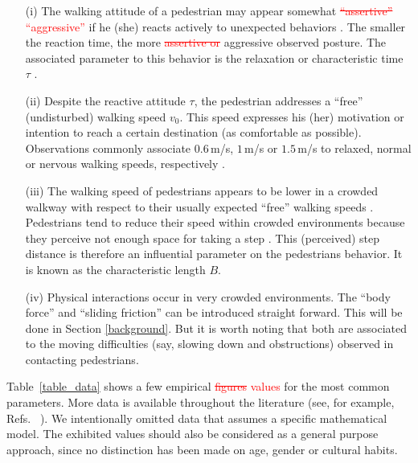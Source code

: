 \documentclass[preprint,12pt]{elsarticle}
\begin{document}
\begin{itemize}
\item[(i)] The walking attitude of a pedestrian may appear somewhat 
 \textcolor{red}{\sout{``assertive''} ``aggressive''} if he (she) reacts actively to unexpected behaviors 
\cite{lakoba_2005,helbing_1995}. The smaller the reaction time, the more 
\textcolor{red}{\sout{assertive or}}  aggressive observed posture. The associated parameter to this 
behavior is the relaxation or characteristic time $\tau$ 
\cite{johansson_2009,helbing_2000}. 

\item[(ii)] Despite the reactive attitude $\tau$, the pedestrian addresses a 
``free'' (undisturbed) walking speed $v_0$. This speed expresses his (her) 
motivation or intention to reach a certain destination (as comfortable as 
possible). Observations commonly associate $0.6\,$m/s, $1\,$m/s or $1.5\,$m/s 
to relaxed, normal or nervous walking speeds, respectively  
\cite{helbing_1995,helbing_2000,li_2015}. 

\item[(iii)] The walking speed of pedestrians appears to be lower in a 
crowded walkway with respect to their usually expected ``free'' walking speeds 
\cite{weidmann_1992,lakoba_2005}. Pedestrians tend to reduce their speed within 
crowded environments because they perceive not enough space for taking a 
step  \cite{johansson_2009}. This (perceived) step distance 
is therefore an influential parameter on the pedestrians behavior. 
It is known as the characteristic length $B$.

\item[(iv)] Physical interactions occur in very crowded environments. The 
``body force''  and ``sliding friction'' can be introduced straight forward. 
This will be done in Section \ref{background}. But it is worth noting that 
both are associated to the moving difficulties (say, slowing down and 
obstructions) observed in contacting pedestrians. 

\end{itemize}


Table~\ref{table_data} shows a few empirical \textcolor{red}{\sout{figures} values}
 for the most common 
parameters. More data is available throughout the literature (see, for example, 
Refs.~\cite{hoogendoorn_2007,seyfried_2007,johansson_2007,moussaid_2009,
luber_2010,seer_2014,li_2015} ). We intentionally omitted data that assumes a 
specific mathematical model. The exhibited values should also be considered as a 
general purpose approach, since no distinction has been made on age, gender or 
cultural habits. \\
\end{document}
